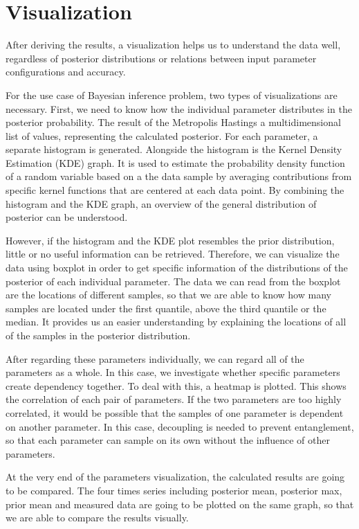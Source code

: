 \section{Visualization}
After deriving the results, a visualization helps us to understand the data well, regardless of posterior distributions or relations between input parameter configurations and accuracy. 

For the use case of Bayesian inference problem, two types of visualizations are necessary. First, we need to know how the individual parameter distributes in the posterior probability. The result of the Metropolis Hastings a multidimensional list of values, representing the calculated posterior. For each parameter, a separate histogram is generated. Alongside the histogram is the Kernel Density Estimation (KDE) graph. It is used to estimate the probability density function of a random variable based on a the data sample by averaging contributions from specific kernel functions that are centered at each data point.\cite{kde} By combining the histogram and the KDE graph, an overview of the general distribution of posterior can be understood.

However, if the histogram and the KDE plot resembles the prior distribution, little or no useful information can be retrieved. Therefore, we can visualize the data using boxplot in order to get specific information of the distributions of the posterior of each individual parameter. The data we can read from the boxplot are the locations of different samples, so that we are able to know how many samples are located under the first quantile, above the third quantile or the median. It provides us an easier understanding by explaining the locations of all of the samples in the posterior distribution.

After regarding these parameters individually, we can regard all of the parameters as a whole. In this case, we investigate whether specific parameters create dependency together. To deal with this, a heatmap is plotted. This shows the correlation of each pair of parameters. If the two parameters are too highly correlated, it would be possible that the samples of one parameter is dependent on another parameter. In this case, decoupling is needed to prevent entanglement, so that each parameter can sample on its own without the influence of other parameters.

At the very end of the parameters visualization, the calculated results are going to be compared. The four times series including posterior mean, posterior max, prior mean and measured data are going to be plotted on the same graph, so that we are able to compare the results visually.

